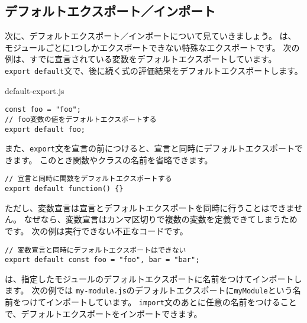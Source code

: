 \hypertarget{default-export-import}{%
\subsection{デフォルトエクスポート／インポート}\label{default-export-import}}

次に、デフォルトエクスポート／インポートについて見ていきましょう。
\textbf{}は、モジュールごとに1つしかエクスポートできない特殊なエクスポートです。
次の例は、すでに宣言されている変数をデフォルトエクスポートしています。
\texttt{export default}文で、後に続く式の評価結果をデフォルトエクスポートします。

\begin{listtitle}
default-export.js
\end{listtitle}
\begin{lstlisting}
const foo = "foo";
// foo変数の値をデフォルトエクスポートする
export default foo;
\end{lstlisting}
\listend

また、\texttt{export}文を宣言の前につけると、宣言と同時にデフォルトエクスポートできます。
このとき関数やクラスの名前を省略できます。

\begin{lstlisting}
// 宣言と同時に関数をデフォルトエクスポートする
export default function() {}
\end{lstlisting}

ただし、変数宣言は宣言とデフォルトエクスポートを同時に行うことはできません。
なぜなら、変数宣言はカンマ区切りで複数の変数を定義できてしまうためです。
次の例は実行できない不正なコードです。\enlargethispage{\baselineskip}

\begin{lstlisting}
// 変数宣言と同時にデフォルトエクスポートはできない
export default const foo = "foo", bar = "bar";
\end{lstlisting}

\textbf{}は、指定したモジュールのデフォルトエクスポートに名前をつけてインポートします。
次の例では
\texttt{my-module.js}のデフォルトエクスポートに\texttt{myModule}という名前をつけてインポートしています。
\texttt{import}文のあとに任意の名前をつけることで、デフォルトエクスポートをインポートできます。


